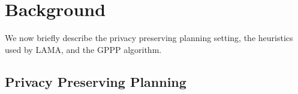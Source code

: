 \documentclass[letterpaper]{article}
\theoremstyle{definition}
\begin{document}



\section{Background}

We now briefly describe the privacy preserving planning setting, the heuristics used by LAMA, and the GPPP algorithm. 


\subsection{Privacy Preserving Planning}
\end{document}
